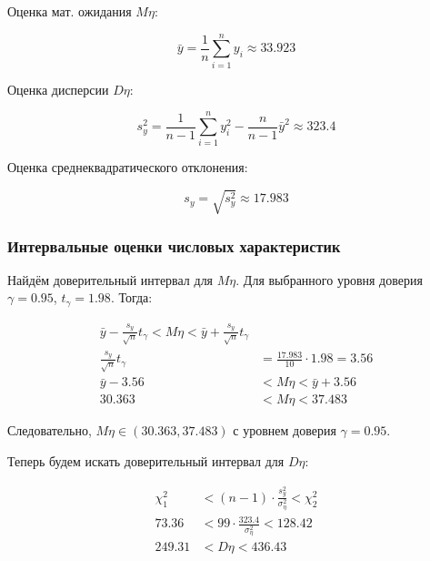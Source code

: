 \documentclass{report}
\begin{document}
Оценка мат. ожидания $M\eta$: 

\begin{equation}
\bar y = \frac{1}{n}\sum \limits_{i=1}^{n}y_i \approx 33.923
\end{equation}

Оценка дисперсии $D\eta$:

\begin{equation}
s_y^2 = \frac{1}{n - 1} \sum \limits_{i = 1}^{n} y_i^2 - \frac{n}{n - 1} \bar y^2 \approx 323.4
\end{equation}

Оценка среднеквадратического отклонения: 

\begin{equation}
s_y = \sqrt{s_y^2} \approx 17.983
\end{equation}

\newpage

\subsubsection*{Интервальные оценки числовых характеристик}

Найдём доверительный интервал для $M\eta$. Для выбранного уровня доверия $\gamma = 0.95$, $t_\gamma = 1.98$. Тогда:

\begin{equation*}
\begin{split}
\bar y - \frac{s_y}{\sqrt{n}}t_\gamma < M\eta < \bar y + \frac{s_y}{\sqrt{n}}t_\gamma \\
\frac{s_y}{\sqrt{n}}t_\gamma & = \frac{17.983}{10} \cdot 1.98 = 3.56 \\
\bar y - 3.56   & < M\eta < \bar y + 3.56 \\
30.363          & < M\eta < 37.483
\end{split}
\end{equation*}

Следовательно, $M\eta \in \left ( 30.363, 37.483 \right )$ с уровнем доверия $\gamma = 0.95$.

Теперь будем искать доверительный интервал для $D\eta$:

\begin{equation*}
\begin{split}
\chi^2_1 & < \left(n-1\right) \cdot \frac{s^2_y}{\sigma^2_\eta} < \chi^2_2 \\
73.36  & < 99 \cdot \frac{323.4}{\sigma_\eta^2} < 128.42 \\
249.31 & < D\eta                            < 436.43
\end{split}
\end{equation*}
\end{document}
